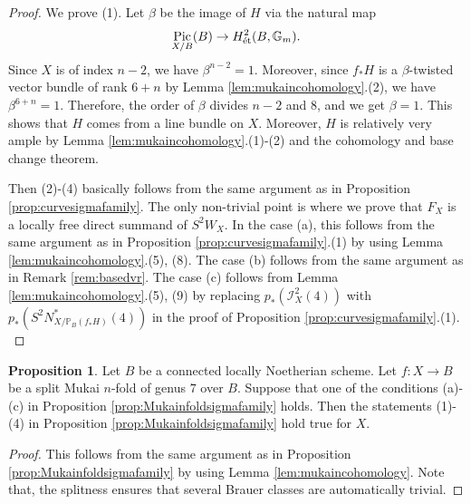 \documentclass[autodetect-engine, a4paper]{amsart}
\theoremstyle{definition}
\newtheorem{prop}[thm]{Proposition}
\def\G{{\mathbb G}}
\def\P{{\mathbb P}}
\DeclareMathOperator\Pic{\mathrm{Pic}}
\def\et{\mathop{\text{\rm \'et}}}
\newcommand{\cred}{\color{black}}
\newcommand{\cora}{\color{black}}
\begin{document}
\begin{proof}
We prove (1).
Let $\beta$ be the image of $H$ via the natural map
\[
\Pic_{X/B} (B) \rightarrow H^2_{\et}(B,\G_{m}).
\]
Since $X$ is of index $n-2$, we have $\beta^{n-2} =1$.
Moreover, since $f_{\ast} H$ is a $\beta$-twisted vector bundle of rank $6+n$ by Lemma \ref{lem:mukaincohomology}.(2), we have $\beta^{6+n}=1$. 
Therefore, the order of $\beta$ divides $n-2$ and $8$, and we get $\beta =1.$
{\cred This shows that $H$ comes from a line bundle on $X$.}
Moreover, $H$ is relatively very ample by Lemma \ref{lem:mukaincohomology}.(1)-(2) and the cohomology and base change theorem.

Then (2)-(4) basically follows from the same argument as in Proposition \ref{prop:curvesigmafamily}.
{\cora The only non-trivial point is where we prove that $F_{X}$ is a locally free direct summand of $S^2 W_X$.
In the case (a), this follows from the same argument as in Proposition \ref{prop:curvesigmafamily}.(1) by using Lemma \ref{lem:mukaincohomology}.(5), (8).
The case (b) follows from the same argument as in Remark \ref{rem:basedvr}.
The case (c) follows from Lemma \ref{lem:mukaincohomology}.(5), (9) by replacing $p_{\ast} (\mathcal{I}_{X}^{2} (4))$ with $p_{\ast} (S^2 N^*_{X/\P_{B}(f_*H)}(4))$ in the proof of Proposition \ref{prop:curvesigmafamily}.(1).
}
\end{proof}

\begin{prop}
\label{prop:splitsigmaisom}
Let $B$ be a {\cred connected locally Noetherian} scheme. 
Let $f \colon X \rightarrow B$ be a split Mukai $n$-fold of genus $7$ over $B$.
{\cora Suppose that one of the conditions (a)-(c) in Proposition \ref{prop:Mukainfoldsigmafamily} holds.
Then the statements (1)-(4) in Proposition \ref{prop:Mukainfoldsigmafamily} hold true for $X$.}
\end{prop}

\begin{proof}
This follows from the same argument as in Proposition \ref{prop:Mukainfoldsigmafamily} by using Lemma \ref{lem:mukaincohomology}. Note that, the splitness ensures that several Brauer classes are automatically trivial.
\end{proof}
\end{document}
